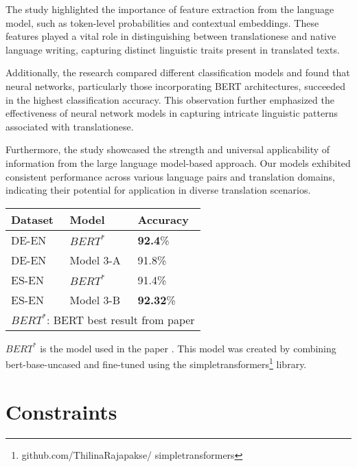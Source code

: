 The study highlighted the importance of feature extraction from the language model, such as token-level probabilities and contextual embeddings. These features played a vital role in distinguishing between translationese and native language writing, capturing distinct linguistic traits present in translated texts.

Additionally, the research compared different classification models and found that neural networks, particularly those incorporating BERT architectures, succeeded in the highest classification accuracy. This observation further emphasized the effectiveness of neural network models in capturing intricate linguistic patterns associated with translationese.

Furthermore, the study showcased the strength and universal applicability of information from the large language model-based approach. Our models exhibited consistent performance across various language pairs and translation domains, indicating their potential for application in diverse translation scenarios.

\vspace{0.2cm}

\begin{center}
    \begin{tabular}{|p{2.5cm}||p{2.5cm}|p{2.5cm}|  }
     \hline
    Dataset	& Model & Accuracy \\
     \hline
     \hline
    DE-EN&  $BERT^{*}$  &  \textbf{92.4}\%\\
    DE-EN&  Model 3-A  &  91.8\%  \\
    \hline
    \hline
    ES-EN&  $BERT^{*}$  &  91.4\%\\
    ES-EN&  Model 3-B  &  \textbf{92.32}\%  \\
     \hline
     \multicolumn{3}{|c|}{$BERT^{*}$: BERT best result from paper \cite{mainpaper}} \\
     \hline
    \end{tabular}
\end{center}

$BERT^{*}$ is the model used in the paper \cite{mainpaper}. This model was created by combining bert-base-uncased and fine-tuned using the simpletransformers\footnote{github.com/ThilinaRajapakse/
simpletransformers} library.

\section{Constraints}

